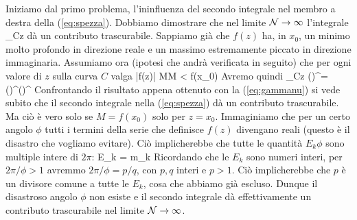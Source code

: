 Iniziamo dal primo problema, l'ininfluenza del secondo integrale nel membro a destra della (\ref{eq:spezza}). Dobbiamo dimostrare che nel limite ${\mathcal N}\to\infty$ l'integrale
\be
{}\int_C\de z
\ee
dà un contributo trascurabile. Sappiamo già che $f(z)$ ha, in $x_0$, un minimo molto profondo in direzione reale e un massimo estremamente piccato in direzione immaginaria. Assumiamo ora (ipotesi che andrà verificata in seguito) che per ogni valore di $z$ sulla curva $C$ valga
\be
|f(z)| \le M\quad M < f(x_0)
\ee
Avremo quindi
\be
{}\int_C\de z \le 
{} \oint\de\theta \simeq 
\left(\right)^\calN = \left(\right)^\calN\left(\right)^\calN
\ee
Confrontando il risultato appena ottenuto con la (\ref{eq:gammanu}) si vede subito che il secondo integrale nella (\ref{eq:spezza}) dà un contributo trascurabile. Ma ciò è vero solo se $M = f(x_0)$ solo per $z = x_0$. Immaginiamo che per un certo angolo $\phi$ tutti i termini della serie che definisce $f(z)$ divengano reali (questo è il disastro che vogliamo evitare). Ciò implicherebbe che tutte le quantità $E_k\phi$ sono multiple intere di $2\pi$:
\be
E_k = m_k\frac{2\pi}{\phi}
\ee
Ricordando che le $E_k$ sono numeri interi, per $2\pi/\phi > 1$ avremmo $2\pi/\phi = p/q$, con $p, q$ interi e $p > 1$. Ciò implicherebbe che $p$ è un divisore comune a tutte le $E_k$, cosa che abbiamo già escluso. Dunque il disastroso angolo $\phi$ non esiste e il secondo integrale dà effettivamente un contributo trascurabile nel limite ${\mathcal N}\to\infty$.


